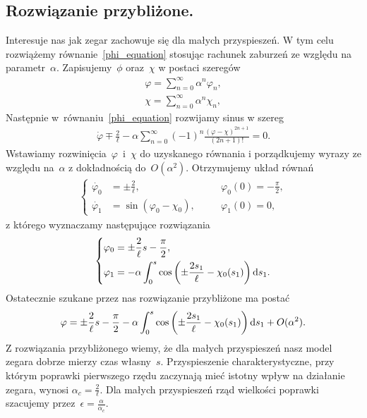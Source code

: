 \subsection{Rozwiązanie przybliżone.}
Interesuje nas jak zegar zachowuje się dla małych przyspieszeń. 
W tym celu rozwiążemy równanie~\eqref{phi_equation} stosując 
rachunek zaburzeń ze względu na 
parametr~$\alpha$. Zapisujemy~$\phi$ oraz~$\chi$ w postaci
szeregów %
\begin{align}\nonumber %
\varphi = \sum_{n=0}^{\infty} \alpha^n \varphi_n, \\
\chi = \sum_{n=0}^{\infty} \alpha^n \chi_n , \nonumber %
\end{align}
Następnie w~równaniu~\eqref{phi_equation} rozwijamy sinus 
w szereg %
\begin{align}\nonumber %
\dot{\varphi} \mp \frac{2}{\ell} - \alpha
\sum_{n=0}^{\infty} (-1)^n 
\frac{(\varphi-\chi)^{2n+1}}{(2n+1)!} =0.
\end{align}
\newpage
Wstawiamy 
rozwinięcia~$\varphi$~i~$\chi$ do uzyskanego równania i porządkujemy wyrazy
ze względu na~$\alpha$ z dokładnością do~$O(\alpha^2)$.
 Otrzymujemy układ równań %
\begin{align*}%
\left\{ 
\begin{aligned}
\dot{\varphi_0} & = \pm \frac{2}{\ell} , &\quad & 
\varphi_0(0)=-\frac{\pi}{2},\\
\dot{\varphi_1} & = \sin (\varphi_0 - \chi_0  ), &\quad & 
\varphi_1(0) = 0 ,
\end{aligned}
\right.
\end{align*}
z którego wyznaczamy następujące rozwiązania
\begin{align*}%
\left\{ 
\begin{aligned}
\varphi_0 & =  \pm \frac{2}{\ell}s - \frac{\pi}{2},\\
\varphi_1 & =  -\alpha \int_0^s \cos 
\left( \pm \frac{2 s_1}{ \ell}  - \chi_0(s_1)  \right) \d s_1 .
\end{aligned}
\right.
\end{align*}
Ostatecznie szukane przez nas rozwiązanie przybliżone ma 
postać
\begin{align}\label{phi_szereg_rozwiazanie}
\varphi =  \pm \frac{2}{\ell}s - \frac{\pi}{2} 
-\alpha  \int_0^s \cos \left( \pm \frac{2 s_1}{ \ell} 
 - \chi_0(s_1)  \right) \text{d} s_1 
+O(\alpha^2).
\end{align}
Z rozwiązania przybliżonego wiemy, 
że dla małych przyspieszeń nasz model zegara dobrze 
mierzy czas własny~$s$. 
Przyspieszenie charakterystyczne, przy którym poprawki pierwszego rzędu 
zaczynają mieć istotny wpływ na działanie zegara, wynosi
$\alpha_c = \frac{2}{\ell}$. 
Dla małych przyspieszeń rząd wielkości poprawki szacujemy 
przez~$\epsilon = \frac{\alpha}{\alpha_c}.$
